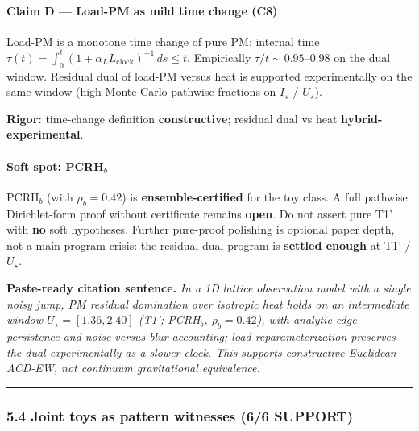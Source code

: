 \documentclass[
  11pt,
]{article}
\begin{document}
\paragraph{\texorpdfstring{Claim D --- Load-PM as mild time change
(\textbf{C8})}{Claim D --- Load-PM as mild time change (C8)}}\label{claim-d-load-pm-as-mild-time-change-c8}

Load-PM is a monotone time change of pure PM: internal time
\(\tau(t)=\int_0^t(1+\alpha_L L_{\mathrm{clock}})^{-1}\,ds\le t\).
Empirically \(\tau/t\sim 0.95\)--\(0.98\) on the dual window. Residual
dual of load-PM versus heat is supported experimentally on the same
window (high Monte Carlo pathwise fractions on \(I_\star\) /
\(U_\star\)).

\textbf{Rigor:} time-change definition \textbf{constructive}; residual
dual vs heat \textbf{hybrid-experimental}.

\paragraph{\texorpdfstring{Soft spot:
PCRH\(_b\)}{Soft spot: PCRH\_b}}\label{soft-spot-pcrh_b}

PCRH\(_b\) (with \(\rho_b=0.42\)) is \textbf{ensemble-certified} for the
toy class. A full pathwise Dirichlet-form proof without certificate
remains \textbf{open}. Do not assert pure T1' with \textbf{no} soft
hypotheses. Further pure-proof polishing is optional paper depth, not a
main program crisis: the residual dual program is \textbf{settled
enough} at T1' / \(U_\star\).

\textbf{Paste-ready citation sentence.} \emph{In a 1D lattice
observation model with a single noisy jump, PM residual domination over
isotropic heat holds on an intermediate window \(U_\star=[1.36,2.40]\)
(T1'; PCRH\(_b\), \(\rho_b=0.42\)), with analytic edge persistence and
noise-versus-blur accounting; load reparameterization preserves the dual
experimentally as a slower clock. This supports constructive Euclidean
ACD-EW, not continuum gravitational equivalence.}

\begin{center}\rule{0.5\linewidth}{0.5pt}\end{center}

\subsubsection{5.4 Joint toys as pattern witnesses (6/6
SUPPORT)}\label{joint-toys-as-pattern-witnesses-66-support}
\end{document}
